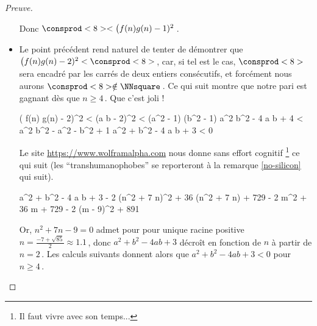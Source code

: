 \begin{proof}[Preuve]
\begin{itemize}
        \noindent
        Donc $\consprod<8> < \big( f(n) g(n) - 1)^2$\,.


		\item Le point précédent rend naturel de tenter de démontrer que 
		$\big( f(n) g(n) - 2)^2 < \consprod<8>$\,, car, si tel est le cas, 
		$\consprod<8>$ sera encadré par les carrés de deux entiers consécutifs, et forcément nous aurons $\consprod<8> \notin \NNsquare$\,. 
		Ce qui suit montre que notre pari est gagnant dès que $n \geq 4$\,. Que c'est joli !

        \medskip
        \noindent\kern-6pt%
        \begin{stepcalc}[style = ar*, ope={\iff}]
        	\big( f(n) g(n) - 2)^2 < \consprod<8>
        	(a b - 2)^2 < (a^2 - 1) (b^2 - 1)
        \explnext{}
        	a^2 b^2 - 4 a b + 4 < a^2 b^2 - a^2 - b^2 + 1
        \explnext{}
        	a^2 + b^2 - 4 a b + 3 < 0
        \end{stepcalc}

        \medskip
        \noindent
        Le site \url{https://www.wolframalpha.com} nous donne sans effort cognitif
        \footnote{
        	Il faut vivre avec son temps...
        }
        ce qui suit (les \enquote{transhumanophobes} se reporteront à la remarque \ref{no-silicon} qui suit).

        \medskip
        \noindent\kern-6pt%
        \begin{stepcalc}[style = ar*, ope={=}]
        	a^2 + b^2 - 4 a b + 3
        \explnext{}
        	- 2 (n^2 + 7 n)^2 + 36 (n^2 + 7 n) + 729
        	- 2 m^2 + 36 m + 729
        \explnext{}
        	- 2 (m - 9)^2 + 891
        \end{stepcalc}
        
        \medskip
        
        \noindent
        Or, $n^2 + 7 n - 9 = 0$ admet pour pour unique racine positive $n = \frac{- 7 + \sqrt{85}}{2} \approx \num{1.1}$\,,
        donc $a^2 + b^2 - 4 a b + 3$ décroît en fonction de $n$ à partir de $n = 2$\,. Les calculs suivants donnent alors que $a^2 + b^2 - 4 a b + 3 < 0$ pour $n \geq 4$\,.
	\end{itemize}

	\begin{center}
	\end{center}


\end{proof}
